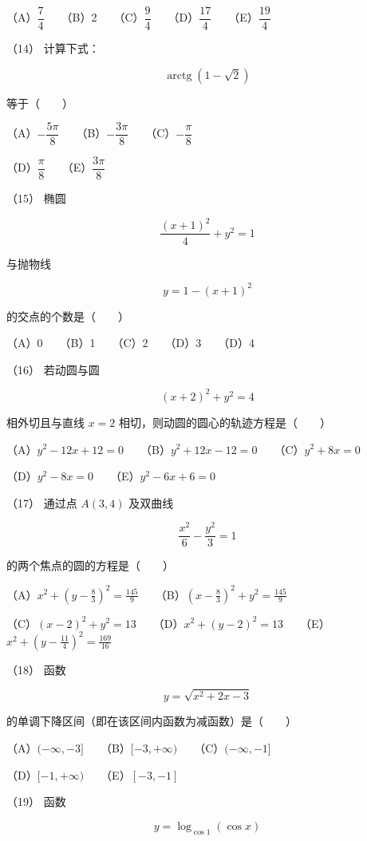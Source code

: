 \begin{question}
（A）$\dfrac74$　　（B）2　　（C）$\dfrac94$　　（D）$\dfrac{17}4$　　（E）$\dfrac{19}4$

（14） 计算下式：

\nopagebreak[4]
\[
\operatorname{arctg}(1-\sqrt2)
\]

等于\mbox{（　　）}

（A）$-\dfrac{5\pi}8$　　（B）$-\dfrac{3\pi}8$　　（C）$-\dfrac\pi8$

（D）$\dfrac\pi8$　　（E）$\dfrac{3\pi}8$

（15） 椭圆

\nopagebreak[4]
\[
\frac{(x+1)^2}{4}+y^2=1
\]

与抛物线

\nopagebreak[4]
\[
y=1-(x+1)^2
\]

的交点的个数是\mbox{（　　）}

（A）0　　（B）1　　（C）2　　（D）3　　（D）4

（16） 若动圆与圆

\nopagebreak[4]
\[
(x+2)^2+y^2=4
\]

相外切且与直线 $x=2$ 相切，则动圆的圆心的轨迹方程是\mbox{（　　）}

（A）$y^2-12x+12=0$　　（B）$y^2+12x-12=0$　　（C）$y^2+8x=0$

（D）$y^2-8x=0$　　（E）$y^2-6x+6=0$

（17） 通过点 $A(3,4)$ 及双曲线

\nopagebreak[4]
\[
\frac{x^2}{6}-\frac{y^2}{3}=1
\]

的两个焦点的圆的方程是\mbox{（　　）}

（A）$x^2+(y-\frac83)^2=\frac{145}{9}$　　（B）$(x-\frac83)^2+y^2=\frac{145}{9}$

（C）$(x-2)^2+y^2=13$　　（D）$x^2+(y-2)^2=13$　　（E）$x^2+(y-\frac{11}4)^2=\frac{169}{16}$

（18） 函数

\nopagebreak[4]
\[
y=\sqrt{x^2+2x-3}
\]

的单调下降区间（即在该区间内函数为减函数）是\mbox{（　　）}

（A）$(-\infty,-3]$　　（B）$[-3,+\infty)$　　（C）$(-\infty,-1]$

（D）$[-1,+\infty)$　　（E）$[-3,-1]$

（19） 函数

\nopagebreak[4]
\[
y=\log_{\cos1}(\cos x)
\]


\end{question}
